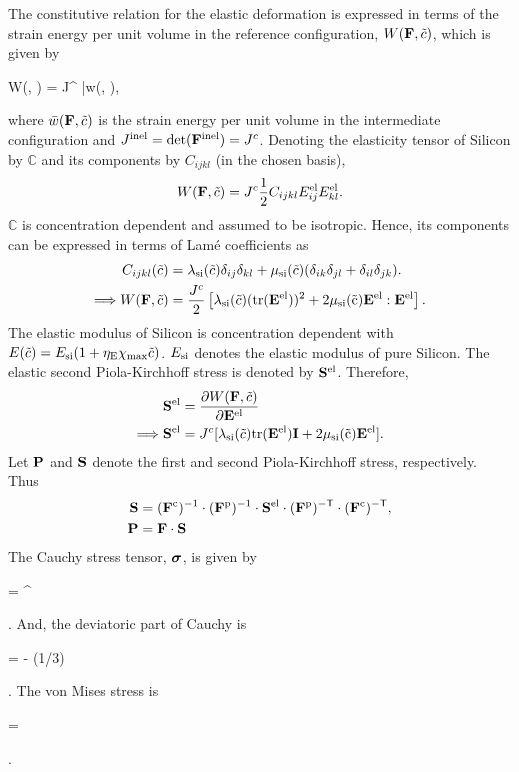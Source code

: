 The constitutive relation for the elastic deformation is expressed in terms of the strain energy per unit volume in the reference configuration, $W(\mathbf{F}, \tilde{c})$, which is given by
\begin{nonumbereq}
    W(\F, \tc) = J^{\inel} \bar{w}(\F, \tc),
\end{nonumbereq}where $\bar{w}(\mathbf{F}, \tilde{c})$ is the strain energy per unit volume in the intermediate configuration and $J^{{\rm{inel}}} = \mathrm{det}(\mathbf{F}^{{\rm{inel}}}) = {J^c}$. Denoting the elasticity tensor of Silicon by $\mathbb{C}$ and its components by $C_{ijkl}$ (in the chosen basis),
\begin{gather}
    W(\mathbf{F}, \tilde{c}) = {J^c} \frac{1}{2} C_{ijkl} E_{ij}^{{\rm{el}}} E_{kl}^{{\rm{el}}}.
\end{gather}
$\mathbb{C}$ is concentration dependent and assumed to be isotropic. Hence, its components can be expressed in terms of Lam\'{e} coefficients as 
\begin{align}
    C_{ijkl}(\tilde{c}) &= \lambda_{\rm{si}}(\tilde{c})\delta_{ij} \delta_{kl} +  \mu_{\rm{si}}(\tilde{c})(\delta_{ik} \delta_{jl} + \delta_{il} \delta_{jk}). \\
    \Longrightarrow W(\mathbf{F}, \tilde{c}) &= \frac{{J^c}}{2}\left[\lambda_{{\rm{si}}}(\tilde{c}) (\rm{tr}(\mathbf{E}^{\rm{el}}))^2 + 2 \mu_{{\rm{si}}}(\tilde{c}) \mathbf{E}^{{\rm{el}}}:\mathbf{E}^{{\rm{el}}}\right].
\end{align}
The elastic modulus of Silicon is concentration dependent with $E(\tilde{c}) = E_{\text{si}}(1 + \eta_{\rm{E}} \chi_{\rm{max}} \tilde{c})$. $E_{{\rm{si}}}$ denotes the elastic modulus of pure Silicon. The elastic second Piola-Kirchhoff stress is denoted by $\mathbf{S}^{\rm{el}}$. Therefore, 
\begin{align}
    \mathbf{S}^{\rm{el}} &= \frac{\partial W(\mathbf{F}, \tilde{c})}{\partial \mathbf{E}^{{\rm{el}}}}\nonumber \\
    \Longrightarrow  \mathbf{S}^{\rm{el}} &= {J^c}[\lambda_{{\rm{si}}}(\tilde{c}) \rm{tr}(\mathbf{E}^{\rm{el}})\mathbf{I} + 2 \mu_{{\rm{si}}}(\tilde{c}) \mathbf{E}^{\rm{el}} ]. \label{eq:Sel_tensor}
\end{align}
Let $\mathbf{P}$ and $\mathbf{S}$ denote the first and second Piola-Kirchhoff stress, respectively. Thus
\begin{align}
    \mathbf{S} &= (\mathbf{F}^{\rm{c}})^{-1} \cdot  (\mathbf{F}^{\rm{p}})^{-1} \cdot \mathbf{S}^{\rm{el}} \cdot  (\mathbf{F}^{\rm{p}})^{{-\sf {T}}} \cdot (\mathbf{F}^{\rm{c}})^{{-\sf {T}}}, \label{eq:S_tensor}\\
    \mathbf{P} &= \mathbf{F} \cdot  \mathbf{S}  \label{eq:P_tensor}
\end{align}
The Cauchy stress tensor, $\bm{\sigma}$, is given by 
\begin{nonumbereq}\CS =  \PK \cdot  \F^\T\
\end{nonumbereq}. And, the deviatoric part of Cauchy is \begin{nonumbereq}\DCS = \CS - (1/3)\tr{\CS}\I
\end{nonumbereq}.
The von Mises stress is 
\begin{nonumbereq}
    \sigmaeff =  
\end{nonumbereq}.

